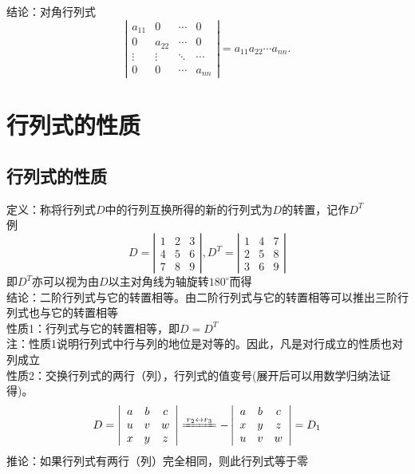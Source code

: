 {\color{green}结论：对角行列式}
$$
\left|\begin{array}{cccc} 
a_{11} & 0 & \cdots & 0 \\
0 & a_{22} & \cdots & 0 \\
\vdots & \vdots & \ddots & \cdots \\
0 & 0 & \cdots & a_{nn}
\end{array}\right|=a_{11}a_{22}\cdots a_{nn}.
$$
\section{行列式的性质}
\subsection{行列式的性质}
{\color{red}定义：}称将行列式$D$中的行列互换所得的新的行列式为$D$的转置，记作$D^{T}$\\
例
$$
D=\left|
\begin{array}{ccc}
1 & 2 & 3 \\
4 & 5 & 6 \\
7 & 8 & 9
\end{array}
\right|,
D^{T}=\left|
\begin{array}{ccc}
1 & 4 & 7 \\
2 & 5 & 8 \\
3 & 6 & 9
\end{array}
\right|
$$
即$D^{T}$亦可以视为由$D$以主对角线为轴旋转$180^{\circ}$而得\\
{\color{green}结论：}二阶行列式与它的转置相等。由二阶行列式与它的转置相等可以推出三阶行列式也与它的转置相等 \\
{\color{blue}性质1：}行列式与它的转置相等，即$D=D^{T}$\\
{\color{red}注：}性质1说明行列式中行与列的地位是对等的。因此，凡是对行成立的性质也对列成立\\
{\color{blue}性质2：}交换行列式的两行（列），行列式的值变号(展开后可以用数学归纳法证得)。\\
$$
D=
\left|
\begin{array}{ccc}
a & b & c \\
u & v & w \\
x & y & z
\end{array}\right|
\xlongequal{r_{2}\leftrightarrow r_{3}}
-\left|
\begin{array}{ccc}
a & b & c \\
x & y & z \\
u & v & w
\end{array}\right|=D_{1}
$$
{\color{blue}推论：}如果行列式有两行（列）完全相同，则此行列式等于零 \\
